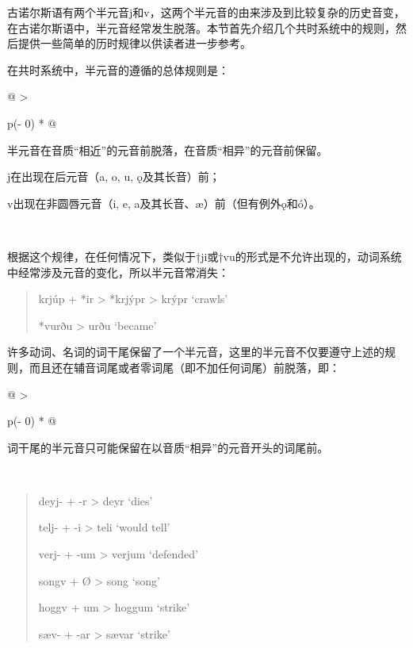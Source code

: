 古诺尔斯语有两个半元音j和v，这两个半元音的由来涉及到比较复杂的历史音变，在古诺尔斯语中，半元音经常发生脱落。本节首先介绍几个共时系统中的规则，然后提供一些简单的历时规律以供读者进一步参考。

在共时系统中，半元音的遵循的总体规则是：

\begin{longtable}[]{@{}
  >{\raggedright\arraybackslash}p{(\columnwidth - 0\tabcolsep) * }@{}}
  \toprule\noalign{}
  \begin{minipage}[b]{\linewidth}\raggedright
    半元音在音质``相近''的元音前脱落，在音质``相异''的元音前保留。

    j在出现在后元音（a, o, u, ǫ及其长音）前；

    v出现在非圆唇元音（i, e, a及其长音、æ）前（但有例外ǫ和ó）。
  \end{minipage} \\
  \midrule\noalign{}
  \endhead
  \bottomrule\noalign{}
  \endlastfoot
\end{longtable}

根据这个规律，在任何情况下，类似于†ji或†vu的形式是不允许出现的，动词系统中经常涉及元音的变化，所以半元音常消失：

\begin{quote}
  krjúp + *ir \textgreater{} *krjýpr \textgreater{} krýpr `crawls'

  *vurðu \textgreater{} urðu `became'
\end{quote}

许多动词、名词的词干尾保留了一个半元音，这里的半元音不仅要遵守上述的规则，而且还在辅音词尾或者零词尾（即不加任何词尾）前脱落，即：

\begin{longtable}[]{@{}
  >{\raggedright\arraybackslash}p{(\columnwidth - 0\tabcolsep) * }@{}}
  \toprule\noalign{}
  \begin{minipage}[b]{\linewidth}\raggedright
    词干尾的半元音只可能保留在以音质``相异''的元音开头的词尾前。
  \end{minipage} \\
  \midrule\noalign{}
  \endhead
  \bottomrule\noalign{}
  \endlastfoot
\end{longtable}

\begin{quote}
  deyj- + -r \textgreater{} deyr `dies'

  telj- + -i \textgreater{} teli `would tell'

  verj- + -um \textgreater{} verjum `defended'

  songv + Ø \textgreater{} song `song'

  hoggv + um \textgreater{} hoggum `strike'

  sæv- + -ar \textgreater{} sævar `strike'
\end{quote}

